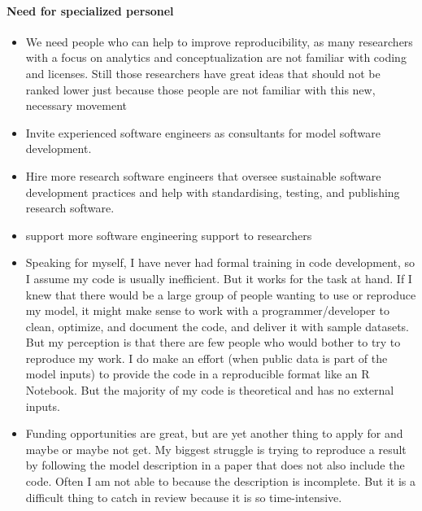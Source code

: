 \documentclass{article}
\begin{document}
\paragraph{Need for specialized personel}
\begin{itemize}
	\item We need people who can help to improve reproducibility, as many researchers with a focus on analytics and conceptualization are not familiar with coding and licenses. Still those researchers have great ideas that should not be ranked lower just because those people are not familiar with this new, necessary movement
	\item Invite experienced software engineers as consultants for model software development.
	\item Hire more research software engineers that oversee sustainable software development practices and help with standardising, testing, and publishing research software.
	\item support more software engineering support to researchers
	\item Speaking for myself, I have never had formal training in code development, so I assume my code is usually inefficient. But it works for the task at hand. If I knew that there would be a large group of people wanting to use or reproduce my model, it might make sense to work with a programmer/developer to clean, optimize, and document the code, and deliver it with sample datasets. But my perception is that there are few people who would bother to try to reproduce my work. I do make an effort (when public data is part of the model inputs) to provide the code in a reproducible format like an R Notebook. But the majority of my code is theoretical and has no external inputs.
	\item Funding opportunities are great, but are yet another thing to apply for and maybe or maybe not get.
My biggest struggle is trying to reproduce a result by following the model description in a paper that does not also include the code. Often I am not able to because the description is incomplete. But it is a difficult thing to catch in review because it is so time-intensive. 


\end{itemize}
\end{document}
